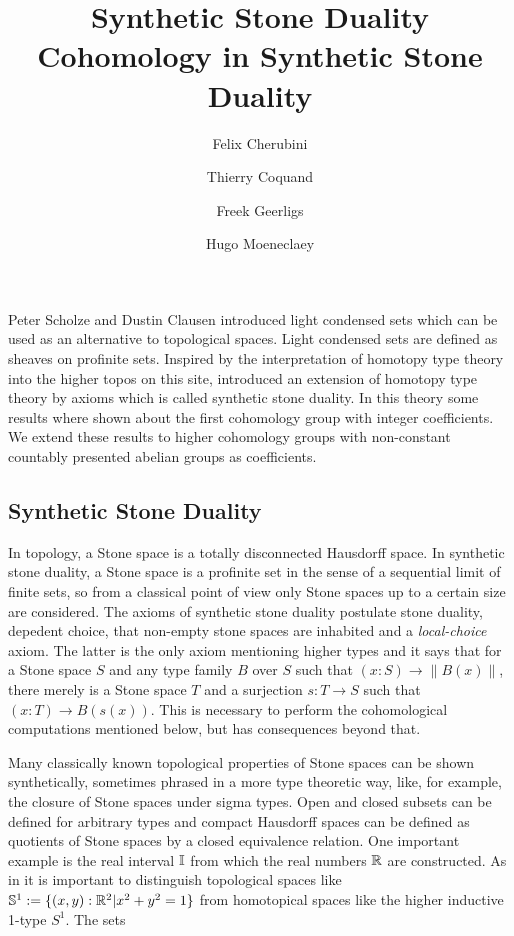 \documentclass{../util/zariski}
\title{Synthetic Stone Duality 
}
\author{
Felix Cherubini %
\and 
 Thierry Coquand%
\and 
 Freek Geerligs%
\and
 Hugo Moeneclaey %
}
\title{Cohomology in Synthetic Stone Duality}
\begin{document}
\maketitle
Peter Scholze and Dustin Clausen \cite{Scholze} introduced light condensed sets which can be used as an alternative to topological spaces. Light condensed sets are defined as sheaves on profinite sets.
Inspired by the interpretation of homotopy type theory into the higher topos on this site, \cite{synthetic-stone-duality} introduced an extension of homotopy type theory by axioms which is called synthetic stone duality. In this theory some results where shown about the first cohomology group with integer coefficients. We extend these results to higher cohomology groups with non-constant countably presented abelian groups as coefficients.

\subsection*{Synthetic Stone Duality}

In topology, a Stone space is a totally disconnected Hausdorff space. In synthetic stone duality, a Stone space is a profinite set in the sense of a sequential limit of finite sets, so from a classical point of view only Stone spaces up to a certain size are considered. The axioms of synthetic stone duality postulate stone duality, depedent choice, that non-empty stone spaces are inhabited and a \emph{local-choice} axiom. The latter is the only axiom mentioning higher types and it says that for a Stone space $S$ and any type family $B$ over $S$ such that $(x:S)\to \| B(x)  \|$, there merely is a Stone space $T$ and a surjection $s:T\to S$ such that $(x:T)\to B(s(x))$. This is necessary to perform the cohomological computations mentioned below, but has consequences beyond that.

Many classically known topological properties of Stone spaces can be shown synthetically, sometimes phrased in a more type theoretic way, like, for example, the closure of Stone spaces under sigma types.
Open and closed subsets can be defined for arbitrary types and compact Hausdorff spaces can be defined as quotients of Stone spaces by a closed equivalence relation.
One important example is the real interval $\mathbb{I}$ from which the real numbers $\mathbb{R}$ are constructed.
As in \cite{shulman-Brouwer-fixed-point} it is important to distinguish topological spaces like $\mathbb{S}^1:=\{(x,y):\mathbb{R}^2\vert x^2+y^2=1\}$ from homotopical spaces like the higher inductive 1-type $S^1$.
The sets
\end{document}
